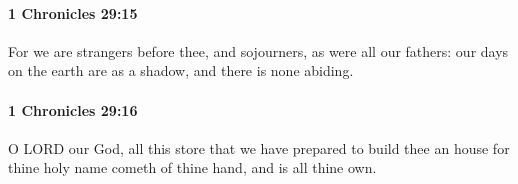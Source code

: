 		\paragraph{1 Chronicles 29:15} %
			\label{1CHRONICLES-29-15}

			For we are strangers before thee, and sojourners, as were all our fathers: our days on the earth are as a shadow, and there is none abiding.


		\paragraph{1 Chronicles 29:16} %
			\label{1CHRONICLES-29-16}

			O LORD our God, all this store that we have prepared to build thee an house for thine holy name cometh of thine hand, and is all thine own.


